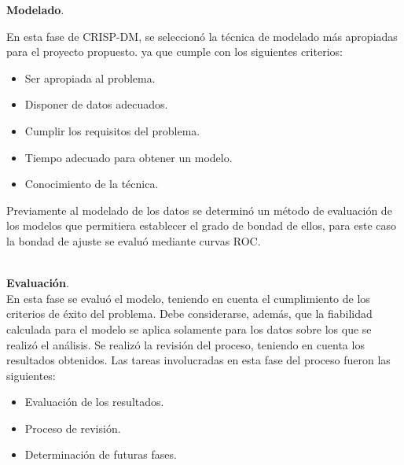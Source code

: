 \noindent
\textbf{Modelado}.

En esta fase de CRISP-DM, se seleccionó la técnica de modelado más apropiadas para el proyecto propuesto. ya que cumple con los siguientes criterios:

\begin{itemize}
\item	Ser apropiada al problema.
\item	Disponer de datos adecuados.
\item	Cumplir los requisitos del problema.
\item	Tiempo adecuado para obtener un modelo.
\item	Conocimiento de la técnica.
\end{itemize}

Previamente al modelado de los datos se determinó un método de evaluación de los modelos que permitiera establecer el grado de bondad de ellos, para este caso la bondad de ajuste se evaluó mediante curvas ROC.\\\

\noindent
\textbf{Evaluación}.\\

	En esta fase se evaluó el modelo, teniendo en cuenta el cumplimiento de los criterios de éxito del problema. Debe considerarse, además, que la fiabilidad calculada para el modelo se aplica solamente para los datos sobre los que se realizó el análisis. Se realizó la revisión del proceso, teniendo en cuenta los resultados obtenidos. Las tareas involucradas en esta fase del proceso fueron las siguientes:\\

\begin{itemize}
\item	Evaluación de los resultados.
\item	Proceso de revisión.
\item	Determinación de futuras fases.
\end{itemize}


